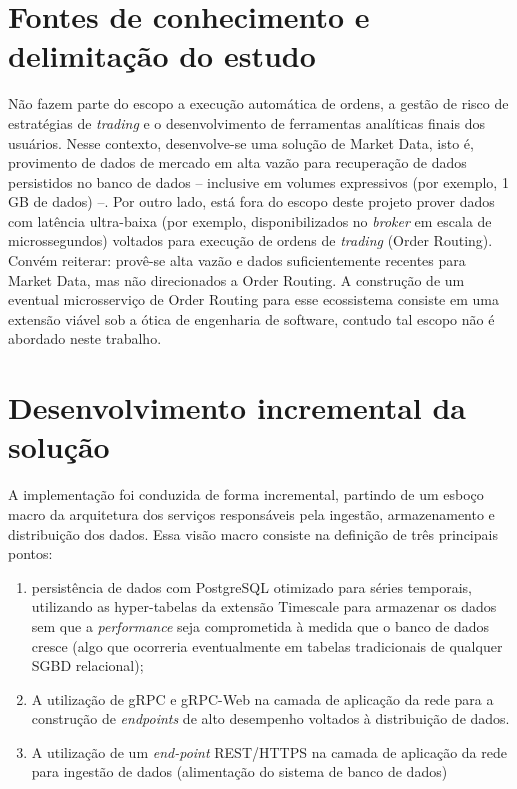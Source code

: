 \section{Fontes de conhecimento e delimitação do estudo}

Não fazem parte do escopo a execução automática de ordens, a gestão de risco de estratégias de \textit{trading} e o desenvolvimento de ferramentas analíticas finais dos usuários. Nesse contexto, desenvolve-se uma solução de Market Data, isto é, provimento de dados de mercado em alta vazão para recuperação de dados persistidos no banco de dados – inclusive em volumes expressivos (por exemplo, 1 GB de dados) –. Por outro lado, está fora do escopo deste projeto prover dados com latência ultra-baixa (por exemplo, disponibilizados no \textit{broker} em escala de microssegundos) voltados para execução de ordens de \textit{trading} (Order Routing). Convém reiterar: provê-se alta vazão e dados suficientemente recentes para Market Data, mas não direcionados a Order Routing. A construção de um eventual microsserviço de Order Routing para esse ecossistema consiste em uma extensão viável sob a ótica de engenharia de software, contudo tal escopo não é abordado neste trabalho.

\section{Desenvolvimento incremental da solução}

A implementação foi conduzida de forma incremental, partindo de um esboço macro da arquitetura dos serviços responsáveis pela ingestão, armazenamento e distribuição dos dados. Essa visão macro consiste na definição de três principais pontos:
\begin{enumerate}
    \item persistência de dados com PostgreSQL otimizado para séries temporais, utilizando as hyper-tabelas da extensão Timescale para armazenar os dados sem que a \textit{performance} seja comprometida à medida que o banco de dados cresce (algo que ocorreria eventualmente em tabelas tradicionais de qualquer SGBD relacional);
    \item A utilização de gRPC e gRPC-Web na camada de aplicação da rede para a construção de \textit{endpoints} de alto desempenho voltados à distribuição de dados.
    \item A utilização de um \textit{end-point} REST/HTTPS na camada de aplicação da rede para ingestão de dados (alimentação do sistema de banco de dados)
\end{enumerate}

